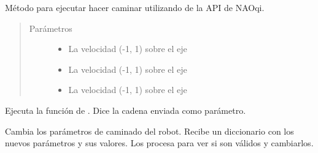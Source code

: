 \begin{fulllineitems}
\label{\detokenize{nao_firebase:nao_robot.Robot.move_robot}}
Método para ejecutar hacer caminar utilizando  de la
API de NAOqi.
\begin{quote}\begin{description}
\item[{Parámetros}] \leavevmode\begin{itemize}
\item {} 
 \textendash{} La velocidad (-1, 1) sobre el eje 

\item {} 
 \textendash{} La velocidad (-1, 1) sobre el eje 

\item {} 
 \textendash{} La velocidad (-1, 1) sobre el eje 

\end{itemize}

\end{description}\end{quote}

\end{fulllineitems}

\begin{fulllineitems}
\label{\detokenize{nao_firebase:nao_robot.Robot.say_speech}}
Ejecuta la función  de . Dice la cadena
enviada como parámetro.

\end{fulllineitems}


\begin{fulllineitems}
\label{\detokenize{nao_firebase:nao_robot.Robot.set_move_config}}
Cambia los parámetros de caminado del robot. Recibe un diccionario
con los nuevos parámetros y sus valores. Los procesa para ver si son válidos
y cambiarlos.

\end{fulllineitems}

